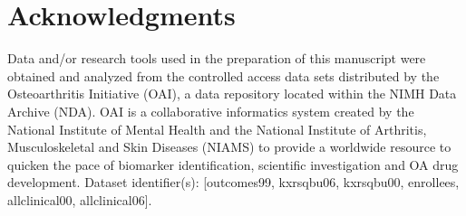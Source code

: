\documentclass[11pt]{article}
\begin{document}
\section*{Acknowledgments}

Data and/or research tools used in the preparation of this manuscript were obtained and analyzed from the controlled access data sets distributed by the Osteoarthritis Initiative (OAI), a data repository located within the NIMH Data Archive (NDA). OAI is a collaborative informatics system created by the National Institute of Mental Health and the National Institute of Arthritis, Musculoskeletal and Skin Diseases (NIAMS) to provide a worldwide resource to quicken the pace of biomarker identification, scientific investigation and OA drug development. Dataset identifier(s): [outcomes99, kxrsqbu06, kxrsqbu00, enrollees, allclinical00, allclinical06].



\end{document}
